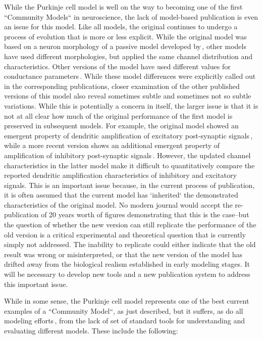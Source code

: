 \documentclass[12pt]{article}
\begin{document}
While the Purkinje cell model is well on the way to becoming one of the first ``Community Models`` in neuroscience, the lack of model-based publication is even an issue for this model.  Like all models, the original continues to undergo a process of evolution that is more or less explicit. While the original model was based on a neuron morphology of a passive model developed by\,\cite{Rapp-P:1994qf}, other models have used different morphologies, but applied the same channel distribution and characteristics. Other versions of the model have used different values for conductance parameters\,\cite{chono03:_purkin}.  While these model differences were explicitly called out in the corresponding publications, closer examination of the other published versions of this model also reveal sometimes subtle and sometimes not so subtle variations.  While this is potentially a concern in itself, the larger issue is that it is not at all clear how much of the original performance of the first model is preserved in subsequent models. For example, the original model showed an emergent property of dendritic amplification of excitatory post-synaptic signals\,\cite{schutter94:_simul_purkin}, while a more recent version shows an additional emergent property of amplification of inhibitory post-synaptic signals\,\cite{Solinas:2006hc}. However, the updated channel characteristics in the latter model make it difficult to quantitatively compare the reported dendritic amplification characteristics of inhibitory and excitatory signals. This is an important issue because, in the current process of publication, it is often assumed that the current model has `inherited` the demonstrated characteristics of the original model.  No modern journal would accept the re-publication of 20 years worth of figures demonstrating that this is the case--but the question of whether the new version can still replicate the performance of the old version is a critical experimental and theoretical question that is currently simply not addressed.  The inability to replicate could either indicate that the old result was wrong or misinterpreted, or that the new version of the model has drifted away from the biological realism established in early modeling stages.  It will be necessary to develop new tools and a new publication system to address this important issue.

While in some sense, the Purkinje cell model represents one of the best current examples of a ``Community Model``, as just described, but it suffers, as do all modeling efforts\,\cite{Nordlie:2009oq}, from the lack of set of standard tools for understanding and evaluating different models.  These include the following:
\end{document}
